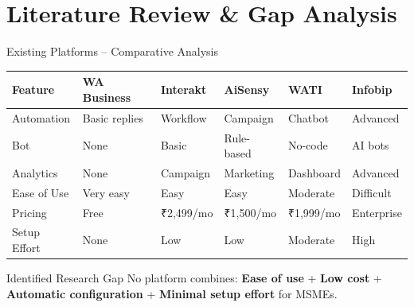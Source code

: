 \documentclass[aspectratio=169]{beamer}
\begin{document}
\section{Literature Review \& Gap Analysis}
\begin{frame}[shrink=10]{Existing Platforms -- Comparative Analysis}

\scriptsize
\renewcommand{\arraystretch}{1.1}
\begin{tabularx}{\textwidth}{|l|X|X|X|X|X|}
\hline
\textbf{Feature} & \textbf{WA Business} & \textbf{Interakt} & \textbf{AiSensy} & \textbf{WATI} & \textbf{Infobip} \\
\hline
Automation & Basic replies & Workflow & Campaign & Chatbot & Advanced \\
\hline
Bot & None & Basic & Rule-based & No-code & AI bots \\
\hline
Analytics & None & Campaign & Marketing & Dashboard & Advanced \\
\hline
Ease of Use & Very easy & Easy & Easy & Moderate & Difficult \\
\hline
Pricing & Free & \textrm{₹}2,499/mo & \textrm{₹}1,500/mo & \textrm{₹}1,999/mo & Enterprise \\
\hline
Setup Effort & None & Low & Low & Moderate & High \\
\hline
\end{tabularx}

\normalsize
\vspace{0.3cm}
\begin{alertblock}{Identified Research Gap}
No platform combines: \textbf{Ease of use} + \textbf{Low cost} + \textbf{Automatic configuration} + \textbf{Minimal setup effort} for MSMEs.
\end{alertblock}

\end{frame}

\end{document}
